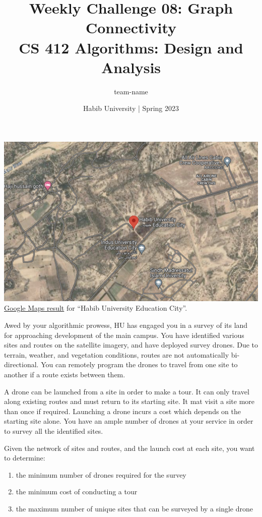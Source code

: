 \documentclass[a4paper]{exam}
\title{Weekly Challenge 08: Graph Connectivity\\CS 412 Algorithms: Design and Analysis}
\author{team-name}  %
\date{Habib University | Spring 2023}
\begin{document}
\maketitle

\begin{questions}

  

  \begin{center}
    \includegraphics[width=.7\textwidth]{campus}\\
    \small \href{https://www.google.com/maps/place/Habib+University+Education+City%E2%80%AD/@25.0000165,67.4035345,776m/data=!3m2!1e3!4b1!4m6!3m5!1s0x394cb5ab8da5ad77:0xd1101c614558c064!8m2!3d25.0000165!4d67.4035345!16s%2Fg%2F11hfg1fyvd?hl=en-PK}{Google Maps result} for ``Habib University Education City''.    
  \end{center}

  Awed by your algorithmic prowess, HU has engaged you in a survey of its land for approaching development of the main campus. You have identified various sites and routes on the satellite imagery, and have deployed survey drones. Due to terrain, weather, and vegetation conditions, routes are not automatically bi-directional. You can remotely program the drones to travel from one site to another if a route exists between them.

  A drone can be launched from a site in order to make a tour. It can only travel along existing routes and must return to its starting site. It mat visit a site more than once if required. Launching a drone incurs a cost which depends on the starting site alone. You have an ample number of drones at your service in order to survey all the identified sites.

  Given the network of sites and routes, and the launch cost at each site, you want to determine:
  \begin{enumerate}
  \item the minimum number of drones required for the survey
  \item the minimum cost of conducting a tour
  \item the maximum number of unique sites that can be surveyed by a single drone
  \end{enumerate}


\end{questions}
\end{document}
